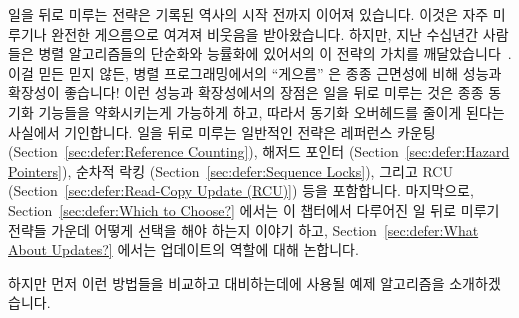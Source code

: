 
%

일을 뒤로 미루는 전략은 기록된 역사의 시작 전까지 이어져 있습니다.
이것은 자주 미루기나 완전한 게으름으로 여겨져 비웃음을 받아왔습니다.
하지만, 지난 수십년간 사람들은 병렬 알고리즘들의 단순화와 능률화에 있어서의 이
전략의 가치를 깨달았습니다~\cite{Kung80,HMassalinPhD}.
이걸 믿든 믿지 않든, 병렬 프로그래밍에서의 ``게으름'' 은 종종 근면성에 비해
성능과 확장성이 좋습니다!
이런 성능과 확장성에서의 장점은 일을 뒤로 미루는 것은 종종 동기화 기능들을
약화시키는게 가능하게 하고, 따라서 동기화 오버헤드를 줄이게 된다는 사실에서
기인합니다.
일을 뒤로 미루는 일반적인 전략은
레퍼런스 카운팅 (Section~\ref{sec:defer:Reference Counting}),
해저드 포인터 (Section~\ref{sec:defer:Hazard Pointers}),
순차적 락킹 (Section~\ref{sec:defer:Sequence Locks}),
그리고 RCU (Section~\ref{sec:defer:Read-Copy Update (RCU)}) 등을 포함합니다.
마지막으로, Section~\ref{sec:defer:Which to Choose?}
에서는 이 챕터에서 다루어진 일 뒤로 미루기 전략들 가운데 어떻게 선택을 해야
하는지 이야기 하고, 
Section~\ref{sec:defer:What About Updates?} 에서는 업데이트의 역할에 대해
논합니다.

하지만 먼저 이런 방법들을 비교하고 대비하는데에 사용될 예제 알고리즘을
소개하겠습니다.
\iffalse

